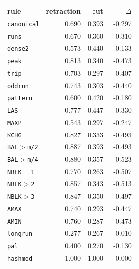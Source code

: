 \begin{tabular}{@{}lrrr@{}}
\toprule
rule & retraction & cut & $\Delta$ \\
\midrule
\texttt{canonical} & 0.690 & 0.393 & -0.297 \\
\texttt{runs} & 0.670 & 0.360 & -0.310 \\
\texttt{dense2} & 0.573 & 0.440 & -0.133 \\
\texttt{peak} & 0.813 & 0.340 & -0.473 \\
\texttt{trip} & 0.703 & 0.297 & -0.407 \\
\texttt{oddrun} & 0.743 & 0.303 & -0.440 \\
\texttt{pattern} & 0.600 & 0.420 & -0.180 \\
\texttt{LAS} & 0.777 & 0.447 & -0.330 \\
\texttt{MAXP} & 0.543 & 0.297 & -0.247 \\
\texttt{KCHG} & 0.827 & 0.333 & -0.493 \\
\texttt{BAL$>$m/2} & 0.887 & 0.393 & -0.493 \\
\texttt{BAL$>$m/4} & 0.880 & 0.357 & -0.523 \\
\texttt{NBLK$=$1} & 0.770 & 0.263 & -0.507 \\
\texttt{NBLK$>$2} & 0.857 & 0.343 & -0.513 \\
\texttt{NBLK$>$3} & 0.847 & 0.350 & -0.497 \\
\texttt{AMAX} & 0.740 & 0.293 & -0.447 \\
\texttt{AMIN} & 0.760 & 0.287 & -0.473 \\
\texttt{longrun} & 0.277 & 0.267 & -0.010 \\
\texttt{pal} & 0.400 & 0.270 & -0.130 \\
\texttt{hashmod} & 1.000 & 1.000 & +0.000 \\
\bottomrule
\end{tabular}

